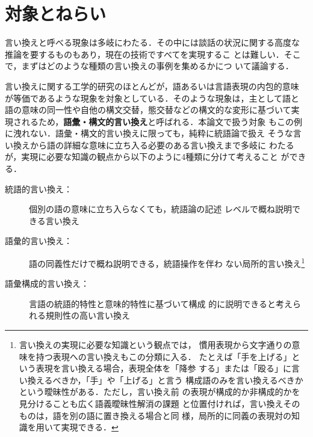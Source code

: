 \section{対象とねらい}
\label{sec:aim}

言い換えと呼べる現象は多岐にわたる．その中には談話の状況に関する高度な
推論を要するものもあり\cite{inui:04:a}，現在の技術ですべてを実現するこ
とは難しい．そこで，まずはどのような種類の言い換えの事例を集めるかにつ
いて議論する．

言い換えに関する工学的研究のほとんどが，語あるいは言語表現の内包的意味
が等価であるような現象を対象としている．そのような現象は，主として語と
語の意味の同一性や自他の構文交替，態交替などの構文的な変形に基づいて実
現されるため，\textbf{語彙・構文的言い換え}と呼ばれる．本論文で扱う対象
もこの例に洩れない．語彙・構文的言い換えに限っても，純粋に統語論で扱え
そうな言い換えから語の詳細な意味に立ち入る必要のある言い換えまで多岐に
わたるが，実現に必要な知識の観点から以下のように4種類に分けて考えること
ができる．
\begin{description}
\item[統語的言い換え：] 個別の語の意味に立ち入らなくても，統語論の記述
  レベルで概ね説明できる言い換え
\end{description}
\begin{description}
\item[語彙的言い換え：] 語の同義性だけで概ね説明できる，統語操作を伴わ
  ない局所的言い換え\footnote{言い換えの実現に必要な知識という観点では，
    慣用表現から文字通りの意味を持つ表現への言い換えもこの分類に入る．
    たとえば「手を上げる」という表現を言い換える場合，表現全体を「降参
      する」または「殴る」に言い換えるべきか，「手」や「上げる」と言う
    構成語のみを言い換えるべきかという曖昧性がある．ただし，言い換え前
    の表現が構成的か非構成的かを見分けることも広く語義曖昧性解消の課題
    と位置付ければ，言い換えそのものは，語を別の語に置き換える場合と同
    様，局所的に同義の表現対の知識を用いて実現できる．}
\end{description}
\begin{description}
\item[語彙構成的言い換え：] 言語の統語的特性と意味的特性に基づいて構成
  的に説明できると考えられる規則性の高い言い換え
\end{description}
